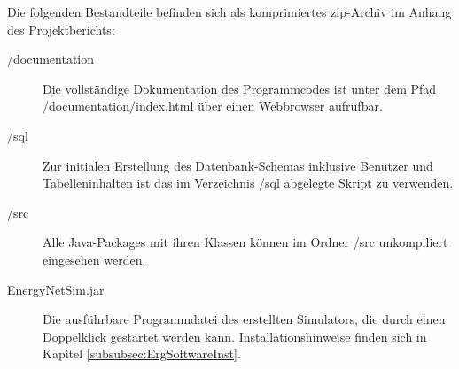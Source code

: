 
\appendix

Die folgenden Bestandteile befinden sich als komprimiertes zip-Archiv im Anhang des Projektberichts:
	\begin{description}
		\item[/documentation] Die vollständige Dokumentation des Programmcodes ist unter dem Pfad /documentation/index.html über einen Webbrowser aufrufbar.
		\item[/sql] Zur initialen Erstellung des Datenbank-Schemas inklusive Benutzer und Tabelleninhalten ist das im Verzeichnis /sql abgelegte Skript zu verwenden.
		\item[/src] Alle Java-Packages mit ihren Klassen können im Ordner /src unkompiliert eingesehen werden.
		\item[EnergyNetSim.jar] Die ausführbare Programmdatei des erstellten Simulators, die durch einen Doppelklick gestartet werden kann. Installationshinweise finden sich in Kapitel \ref{subsubsec:ErgSoftwareInst}.
	\end{description}
